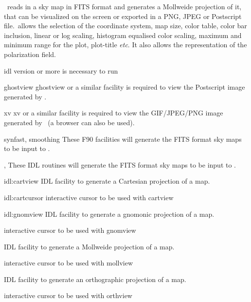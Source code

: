 \begin{codedescription}
{\thedocid \ reads in a \healpix sky map in FITS format and generates a
Mollweide projection of it, that can be visualized on the screen or
exported in a PNG, JPEG or Postscript file.\thedocid \  allows the selection of
the coordinate system, map size, color table, color bar inclusion,
linear or log scaling, histogram equalised
color scaling, maximum and 
minimum range for the plot, plot-title {\it etc}. It also allows the representation of the
polarization field. }
\end{codedescription}


%

\newpage
\begin{related}
  \begin{sulist}{} %
  \item[idl] version \idlversion or more is necessary to run \thedocid
  \item[ghostview] ghostview or a similar facility is required to view
	  the Postscript image generated by \thedocid.
  \item[xv] xv or a similar facility is required to view the
            GIF/JPEG/PNG image generated by \thedocid \ (a browser can also 
            be used).
  \item[synfast, smoothing] These F90 \healpix facilities will generate the FITS format 
            sky maps to be input to \thedocid.
  \item[\htmlref{isynfast}{idl:isynfast}, \htmlref{ismoothing}{idl:ismoothing}] These IDL routines will generate the FITS format 
            sky maps to be input to \thedocid.
  \item[{\htmlref{cartview} {idl:cartview}}] 
	IDL facility to generate a Cartesian projection of
  	a \healpix map.
  \item[{\htmlref{cartcursor} {idl:cartcursor}}] 
	interactive cursor to be used with cartview
  \item[{\htmlref{gnomview} {idl:gnomview}}] 
	IDL facility to generate a gnomonic projection of
  	a \healpix map.
  \item[{\htmlref{gnomcursor}{idl:gnomcursor}}] 
	interactive cursor to be used with gnomview
  \item[{\htmlref{mollview}{idl:mollview}}] 
	IDL facility to generate a Mollweide projection of
  	a \healpix map.
  \item[{\htmlref{mollcursor}{idl:mollcursor}}] interactive cursor to be used with mollview
  \item[{\htmlref{orthview}{idl:orthview}}] 
	IDL facility to generate an orthographic projection of
  	a \healpix map.
  \item[{\htmlref{orthcursor}{idl:orthcursor}}] 
	interactive cursor to be used with orthview
  \end{sulist}
\end{related}



